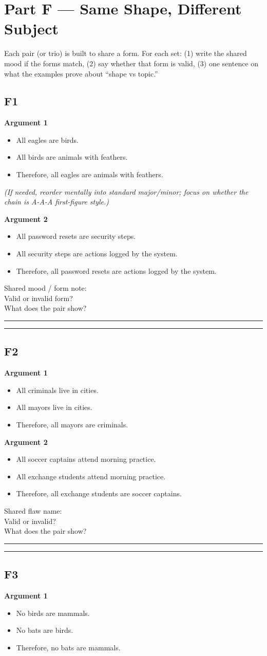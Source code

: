 \documentclass[11pt]{article}
\newcommand{\ansline}{\par\vspace{0.15em}\noindent\rule{\linewidth}{0.4pt}\par\vspace{0.08em}}
\newcommand{\twolines}{\ansline\ansline}
\newcommand{\syllblock}[3]{%
\begin{itemize}[leftmargin=1.2em]
\item #1
\item #2
\item #3
\end{itemize}
}
\begin{document}
\newpage
\section*{Part F --- Same Shape, Different Subject}
\noindent Each pair (or trio) is built to share a form. For each set: (1) write the shared mood if the forms match, (2) say whether that form is valid, (3) one sentence on what the examples prove about ``shape vs topic.''

\subsection*{F1}
\textbf{Argument 1}
\syllblock
{All eagles are birds.}
{All birds are animals with feathers.}
{Therefore, all eagles are animals with feathers.}
\textit{(If needed, reorder mentally into standard major/minor; focus on whether the chain is A-A-A first-figure style.)}

\textbf{Argument 2}
\syllblock
{All password resets are security steps.}
{All security steps are actions logged by the system.}
{Therefore, all password resets are actions logged by the system.}

Shared mood / form note: \underline{\hspace{3.8in}}\\
Valid or invalid form? \underline{\hspace{1.4in}}\\
What does the pair show? \twolines

\subsection*{F2}
\textbf{Argument 1}
\syllblock
{All criminals live in cities.}
{All mayors live in cities.}
{Therefore, all mayors are criminals.}

\textbf{Argument 2}
\syllblock
{All soccer captains attend morning practice.}
{All exchange students attend morning practice.}
{Therefore, all exchange students are soccer captains.}

Shared flaw name: \underline{\hspace{3.2in}}\\
Valid or invalid? \underline{\hspace{1.4in}}\\
What does the pair show? \twolines

\subsection*{F3}
\textbf{Argument 1}
\syllblock
{No birds are mammals.}
{No bats are birds.}
{Therefore, no bats are mammals.}
\end{document}
